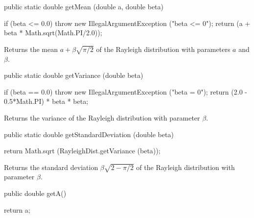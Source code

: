 \begin{code}

   public static double getMean (double a, double beta)\begin{hide} {
      if (beta <= 0.0)
         throw new IllegalArgumentException ("beta <= 0");
      return (a + beta * Math.sqrt(Math.PI/2.0));
   }\end{hide}
\end{code}
\begin{tabb} Returns the mean $a + \beta\sqrt{\pi/2}$ of the
   Rayleigh distribution with parameters $a$ and $\beta$.
\end{tabb}
\begin{htmlonly}
\end{htmlonly}
\begin{code}

   public static double getVariance (double beta)\begin{hide} {
      if (beta == 0.0)
        throw new IllegalArgumentException ("beta = 0");
      return (2.0 - 0.5*Math.PI) * beta * beta;
   }\end{hide}
\end{code}
\begin{tabb} Returns the variance
   of the Rayleigh distribution with parameter $\beta$.
\end{tabb}
\begin{htmlonly}
\end{htmlonly}
\begin{code}

   public static double getStandardDeviation (double beta)\begin{hide} {
      return Math.sqrt (RayleighDist.getVariance (beta));
   }\end{hide}
\end{code}
\begin{tabb} Returns the standard deviation $\beta\sqrt{2 - \pi/2}$ of
  the Rayleigh distribution with parameter $\beta$.
\end{tabb}
\begin{htmlonly}
\end{htmlonly}
\begin{code}

   public double getA()\begin{hide} {
      return a;
   }\end{hide}
\end{code}
